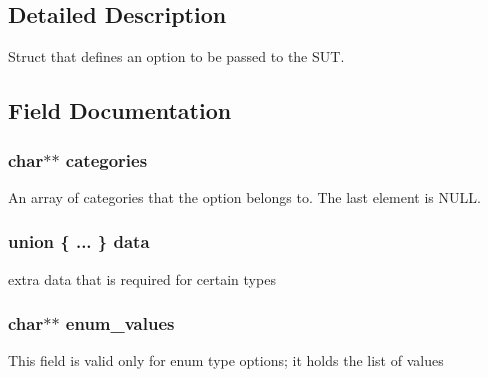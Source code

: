 \subsection{Detailed Description}
Struct that defines an option to be passed to the S\-U\-T. 

\subsection{Field Documentation}
\hypertarget{struct_s_d_l_visual_test___s_u_t_option_a6744d43d3ad17d06068dba9ee7b78c83}{
\subsubsection[{categories}]{\setlength{\rightskip}{0pt plus 5cm}char$\ast$$\ast$ categories}}\label{struct_s_d_l_visual_test___s_u_t_option_a6744d43d3ad17d06068dba9ee7b78c83}
An array of categories that the option belongs to. The last element is N\-U\-L\-L. \hypertarget{struct_s_d_l_visual_test___s_u_t_option_aa9545bd4acd476f61533d04d53cdffdc}{
\subsubsection[{data}]{\setlength{\rightskip}{0pt plus 5cm}union \{ ... \}   data}}\label{struct_s_d_l_visual_test___s_u_t_option_aa9545bd4acd476f61533d04d53cdffdc}
extra data that is required for certain types \hypertarget{struct_s_d_l_visual_test___s_u_t_option_a596ff3567c4b736561dba1915a2cd38d}{
\subsubsection[{enum\-\_\-values}]{\setlength{\rightskip}{0pt plus 5cm}char$\ast$$\ast$ enum\-\_\-values}}\label{struct_s_d_l_visual_test___s_u_t_option_a596ff3567c4b736561dba1915a2cd38d}
\begin{DoxyVerb}This field is valid only for enum type options; it holds the list of values
\end{DoxyVerb}

